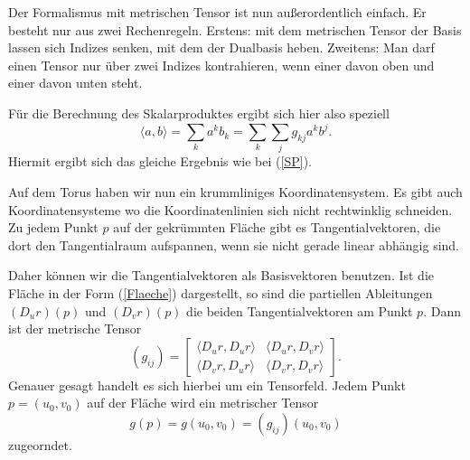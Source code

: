 \documentclass[a4paper,12pt,fleqn]{article}
\begin{document}
Der Formalismus mit metrischen Tensor ist nun außerordentlich
einfach. Er besteht nur aus zwei Rechenregeln. Erstens: mit dem
metrischen Tensor der Basis lassen sich Indizes senken, mit dem
der Dualbasis heben. Zweitens: Man darf einen Tensor nur über zwei
Indizes kontrahieren, wenn einer davon oben und einer davon unten
steht.

Für die Berechnung des Skalarproduktes ergibt sich hier also
speziell
\begin{equation}
\langle a,b\rangle = \sum_k a^k b_k
= \sum_k \sum_j g_{kj} a^k b^j.
\end{equation}
Hiermit ergibt sich das gleiche Ergebnis wie bei (\ref{SP}).

Auf dem Torus haben wir nun ein krummliniges Koordinatensystem.
Es gibt auch Koordinatensysteme wo die Koordinatenlinien sich
nicht rechtwinklig schneiden. Zu jedem Punkt \(p\) auf der gekrümmten
Fläche gibt es Tangentialvektoren, die dort den Tangentialraum
aufspannen, wenn sie nicht gerade linear abhängig sind.

Daher können wir die Tangentialvektoren als Basisvektoren benutzen.
Ist die Fläche in der Form (\ref{Flaeche}) dargestellt, so sind
die partiellen Ableitungen \((D_u r)(p)\) und \((D_v r)(p)\) die
beiden Tangentialvektoren am Punkt \(p\). Dann ist der metrische Tensor
\begin{equation}
(g_{ij}) = \begin{bmatrix}
\langle D_u r,D_u r\rangle & \langle D_u r, D_v r\rangle\\
\langle D_v r,D_u r\rangle & \langle D_v r, D_v r\rangle
\end{bmatrix}.
\end{equation}
Genauer gesagt handelt es sich hierbei um ein Tensorfeld. Jedem
Punkt \(p=(u_0,v_0)\) auf der Fläche wird ein metrischer Tensor
\begin{equation}
g(p) = g(u_0,v_0) = (g_{ij})(u_0,v_0)
\end{equation}
zugeorndet.
\end{document}
